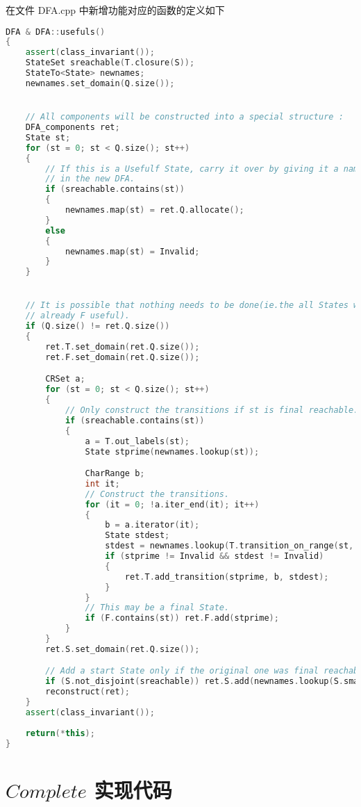 在文件 DFA.cpp 中新增功能对应的函数的定义如下

\begin{lstlisting}[language=C++,label={lst:usefuls-imp},caption={文件 DFA.cpp}]
DFA & DFA::usefuls()
{
    assert(class_invariant());
    StateSet sreachable(T.closure(S));
    StateTo<State> newnames;
    newnames.set_domain(Q.size());


    // All components will be constructed into a special structure :
    DFA_components ret;
    State st;
    for (st = 0; st < Q.size(); st++)
    {
        // If this is a Usefulf State, carry it over by giving it a name
        // in the new DFA.
        if (sreachable.contains(st))
        {
            newnames.map(st) = ret.Q.allocate();
        }
        else
        {
            newnames.map(st) = Invalid;
        }
    }


    // It is possible that nothing needs to be done(ie.the all States were
    // already F useful).
    if (Q.size() != ret.Q.size())
    {
        ret.T.set_domain(ret.Q.size());
        ret.F.set_domain(ret.Q.size());

        CRSet a;
        for (st = 0; st < Q.size(); st++)
        {
            // Only construct the transitions if st is final reachable.
            if (sreachable.contains(st))
            {
                a = T.out_labels(st);
                State stprime(newnames.lookup(st));

                CharRange b;
                int it;
                // Construct the transitions.
                for (it = 0; !a.iter_end(it); it++)
                {
                    b = a.iterator(it);
                    State stdest;
                    stdest = newnames.lookup(T.transition_on_range(st, b));
                    if (stprime != Invalid && stdest != Invalid)
                    {
                        ret.T.add_transition(stprime, b, stdest);
                    }
                }
                // This may be a final State.
                if (F.contains(st)) ret.F.add(stprime);
            }
        }
        ret.S.set_domain(ret.Q.size());

        // Add a start State only if the original one was final reachable.
        if (S.not_disjoint(sreachable)) ret.S.add(newnames.lookup(S.smallest()));
        reconstruct(ret);
    }
    assert(class_invariant());
    
    return(*this);
}
\end{lstlisting}

\section{$Complete$ 实现代码}\label{sec:complete-imp}

